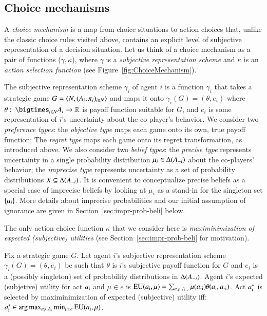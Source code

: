 \documentclass[fleqn,reqno,11pt]{article}
\begin{document}
\subsection{Choice mechanisms}
\label{sec:choice-mechanisms}

A \emph{choice mechanism} is a map from choice situations to action choices that, unlike the
classic choice rules visited above, contains an explicit level of subjective representation of
a decision situation. Let us think of a choice mechanism as a pair of functions
($\gamma,\kappa$), where $\gamma$ is a \emph{subjective representation scheme} and $\kappa$ is
an \emph{action selection function} (see Figure~\ref{fig:ChoiceMechanism}).

The subjective representation scheme $\gamma_i$ of agent $i$ is a function $\gamma_i$ that
takes a strategic game $G = \left \langle  N, (A_i , \pi_i)_{i \in N} \right\rangle$ and maps it onto
$\gamma_i(G) = (\theta, e_i)$ where
$\theta \mycolon \bigtimes_{i \in N} A_i \rightarrow \mathbb{R}$ is payoff function suitable
for $G$, and $e_i$ is some representation of $i$'s uncertainty about the co-player's
behavior. We consider two \emph{preference types}: the \emph{objective type} maps each game
onto its own, true payoff function; The \emph{regret type} maps each game onto its regret
transformation, as introduced above. We also consider two \emph{belief types}: the
\emph{precise type} represents uncertainty in a single probability distribution
$\mu_i \in \Delta(A_{-i})$ about the co-players' behavior; the \emph{imprecise type}
represents uncertainty as a set of probability distributions $X \subseteq \Delta(A_{-i})$.
It is convenient to conceptualize precise beliefs as a special case of imprecise beliefs by
looking at $\mu_i$ as a stand-in for the singleton set $\left\{\mu_i\right\}$. More details about
imprecise probabilities and our initial assumption of ignorance are given in
Section~\ref{sec:impr-prob-beli} below.

The only action choice function $\kappa$ that we consider here is \emph{maximinimization of
  expected (subjective) utilities} (see Section~\ref{sec:impr-prob-beli} for
motivation).

\begin{definition}
  \label{def:maxminSEU}
  Fix a strategic game $G$. Let agent $i$'s subjective representation scheme
  $\gamma_i(G) = (\theta, e_i)$ be such that $\theta$ is $i$'s subjective payoff function for
  $G$ and $e_i$ is a (possibly singleton) set of probability distributions in
  $\Delta(A_{-i})$. Agent $i$'s expected (subjetive) utility for act $a_{\text{i}}$ and
  $\mu \in e$ is
  $\operatorname{EU}(a_{\text{i}}, \mu) = \sum_{a_{\text{-i}} \in A_{-i}} \mu(a_{\text{-i}}) \theta(a_{\text{i}},
  a_{\text{-i}})$.
  Act $a_{\text{i}}^*$ is selected by maximinimization of expected (subjective) utility iff:
  $a_{\text{i}}^* \in \arg \max_{a_{\text{i}} \in A_{i}} \min_{\mu \in e} \operatorname{EU}(a_{\text{i}}, \mu)$.
\end{definition}
\end{document}
